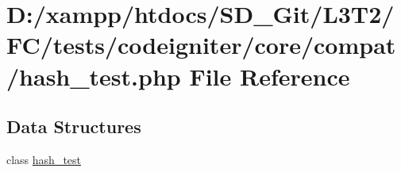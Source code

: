 \hypertarget{hash__test_8php}{}\section{D\+:/xampp/htdocs/\+S\+D\+\_\+\+Git/\+L3\+T2/\+F\+C/tests/codeigniter/core/compat/hash\+\_\+test.php File Reference}
\label{hash__test_8php}
\subsection*{Data Structures}
\begin{DoxyCompactItemize}
\item 
class \hyperlink{classhash__test}{hash\+\_\+test}
\end{DoxyCompactItemize}

